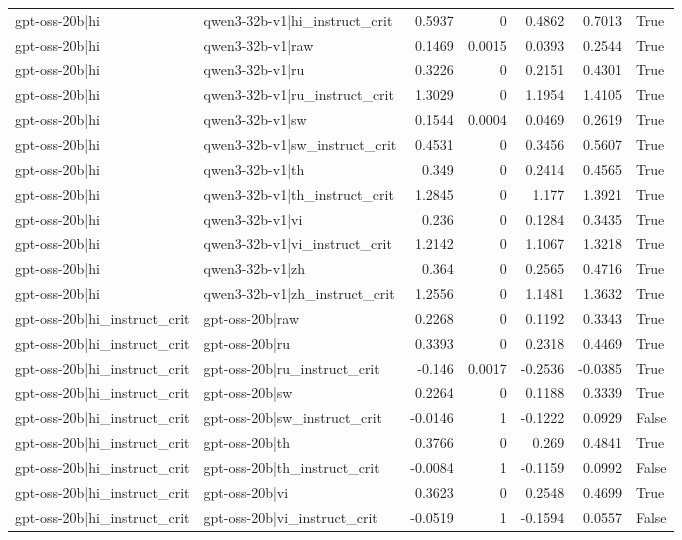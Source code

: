 \begin{table}
\begin{tabular}{l l r r r r l}
gpt-oss-20b|hi & qwen3-32b-v1|hi_instruct_crit & 0.5937 & 0 & 0.4862 & 0.7013 & True \\
gpt-oss-20b|hi & qwen3-32b-v1|raw & 0.1469 & 0.0015 & 0.0393 & 0.2544 & True \\
gpt-oss-20b|hi & qwen3-32b-v1|ru & 0.3226 & 0 & 0.2151 & 0.4301 & True \\
gpt-oss-20b|hi & qwen3-32b-v1|ru_instruct_crit & 1.3029 & 0 & 1.1954 & 1.4105 & True \\
gpt-oss-20b|hi & qwen3-32b-v1|sw & 0.1544 & 0.0004 & 0.0469 & 0.2619 & True \\
gpt-oss-20b|hi & qwen3-32b-v1|sw_instruct_crit & 0.4531 & 0 & 0.3456 & 0.5607 & True \\
gpt-oss-20b|hi & qwen3-32b-v1|th & 0.349 & 0 & 0.2414 & 0.4565 & True \\
gpt-oss-20b|hi & qwen3-32b-v1|th_instruct_crit & 1.2845 & 0 & 1.177 & 1.3921 & True \\
gpt-oss-20b|hi & qwen3-32b-v1|vi & 0.236 & 0 & 0.1284 & 0.3435 & True \\
gpt-oss-20b|hi & qwen3-32b-v1|vi_instruct_crit & 1.2142 & 0 & 1.1067 & 1.3218 & True \\
gpt-oss-20b|hi & qwen3-32b-v1|zh & 0.364 & 0 & 0.2565 & 0.4716 & True \\
gpt-oss-20b|hi & qwen3-32b-v1|zh_instruct_crit & 1.2556 & 0 & 1.1481 & 1.3632 & True \\
gpt-oss-20b|hi_instruct_crit & gpt-oss-20b|raw & 0.2268 & 0 & 0.1192 & 0.3343 & True \\
gpt-oss-20b|hi_instruct_crit & gpt-oss-20b|ru & 0.3393 & 0 & 0.2318 & 0.4469 & True \\
gpt-oss-20b|hi_instruct_crit & gpt-oss-20b|ru_instruct_crit & -0.146 & 0.0017 & -0.2536 & -0.0385 & True \\
gpt-oss-20b|hi_instruct_crit & gpt-oss-20b|sw & 0.2264 & 0 & 0.1188 & 0.3339 & True \\
gpt-oss-20b|hi_instruct_crit & gpt-oss-20b|sw_instruct_crit & -0.0146 & 1 & -0.1222 & 0.0929 & False \\
gpt-oss-20b|hi_instruct_crit & gpt-oss-20b|th & 0.3766 & 0 & 0.269 & 0.4841 & True \\
gpt-oss-20b|hi_instruct_crit & gpt-oss-20b|th_instruct_crit & -0.0084 & 1 & -0.1159 & 0.0992 & False \\
gpt-oss-20b|hi_instruct_crit & gpt-oss-20b|vi & 0.3623 & 0 & 0.2548 & 0.4699 & True \\
gpt-oss-20b|hi_instruct_crit & gpt-oss-20b|vi_instruct_crit & -0.0519 & 1 & -0.1594 & 0.0557 & False \\

\end{tabular}
\end{table}
